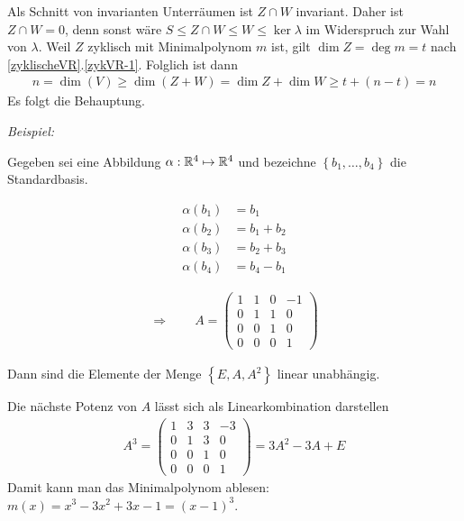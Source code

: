 \begin{mysatz}
\begin{enumerate}
            Als Schnitt von invarianten Unterräumen ist $Z \cap W$ invariant.
            Daher ist $Z \cap W = 0$, denn sonst wäre $S \leq Z \cap W \leq W \leq \ker \lambda$ im Widerspruch zur Wahl von $\lambda$.
            Weil $Z$ zyklisch mit Minimalpolynom $m$ ist, gilt $\dim Z = \deg m = t$ nach \ref{zyklischeVR}.\ref{zykVR-1}.
            Folglich ist dann
            \begin{align*}
                n = \dim (V) \geq \dim(Z + W) = \dim Z + \dim W \geq t + (n-t) = n
            \end{align*}
            Es folgt die Behauptung.
    \end{enumerate}
\end{mysatz}


\textit{Beispiel:}

Gegeben sei eine Abbildung $\alpha:\mathbb{R}^4 \mapsto \mathbb{R}^4$ und bezeichne $\left\{ b_1, \ldots, b_4 \right\}$ die Standardbasis.

\begin{minipage}{0.4\linewidth}
    \begin{align*}
        \alpha(b_1) & = b_1\\
        \alpha(b_2) & = b_1 + b_2\\
        \alpha(b_3) & = b_2 + b_3\\
        \alpha(b_4) & = b_4 - b_1
    \end{align*}
\end{minipage}
\begin{minipage}{0.5\linewidth}
    \begin{align*}
        \Rightarrow \qquad A =
        \begin{pmatrix}
            1 & 1 & 0 & -1\\
            0 & 1 & 1 & 0\\
            0 & 0 & 1 & 0\\
            0 & 0 & 0 & 1
        \end{pmatrix}
    \end{align*}
\end{minipage}\par\medskip

Dann sind die Elemente der Menge $\left\{ E, A, A^2 \right\}$ linear unabhängig.

Die nächste Potenz von $A$ lässt sich als Linearkombination darstellen
\begin{align*}
    A^3 =
    \begin{pmatrix}
        1 & 3 & 3 & -3\\
        0 & 1 & 3 & 0\\
        0 & 0 & 1 & 0\\
        0 & 0 & 0 & 1
    \end{pmatrix}
    = 3A^2-3A+E
\end{align*}
Damit kann man das Minimalpolynom ablesen: $m(x) = x^3 - 3x^2 + 3x-1 = (x-1)^3$.\par\medskip

